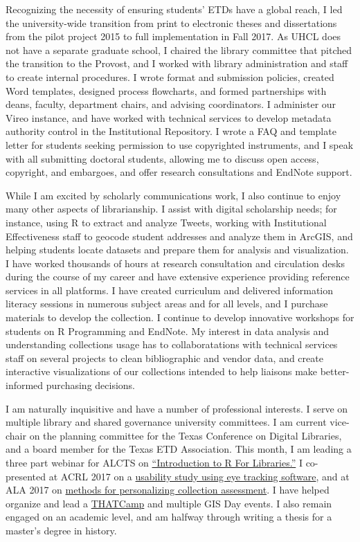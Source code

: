 \documentclass[12pt]{article}
\begin{document}
Recognizing the necessity of ensuring students' ETDs have a global reach, I led the university-wide transition from print to electronic theses and dissertations from the pilot project 2015 to full implementation in Fall 2017. As UHCL does not have a separate graduate school, I chaired the library committee that pitched the transition to the Provost, and I worked with library administration and staff to create internal procedures. I wrote format and submission policies, created Word templates, designed process flowcharts, and formed partnerships with deans, faculty, department chairs, and advising coordinators. I administer our Vireo instance, and have worked with technical services to develop metadata authority control in the Institutional Repository. I wrote a FAQ and template letter for students seeking permission to use copyrighted instruments, and I speak with all submitting doctoral students, allowing me to discuss open access, copyright, and embargoes, and offer research consultations and EndNote support. 

While I am excited by scholarly communications work, I also continue to enjoy many other aspects of librarianship. I assist with digital scholarship needs; for instance, using R to extract and analyze Tweets, working with Institutional Effectiveness staff to geocode student addresses and analyze them in ArcGIS, and helping students locate datasets and prepare them for analysis and visualization. I have worked thousands of hours at research consultation and circulation desks during the course of my career and have extensive experience providing reference services in all platforms. I have created curriculum and delivered information literacy sessions in numerous subject areas and for all levels, and I purchase materials to develop the collection. I continue to develop innovative workshops for students on R Programming and EndNote. My interest in data analysis and understanding collections usage has to collaboratations with technical services staff on several projects to clean bibliographic and vendor data, and create interactive visualizations of our collections intended to help liaisons make better-informed purchasing decisions. 

I am naturally inquisitive and have a number of professional interests. I serve on multiple library and shared governance university committees. I am current vice-chair on the planning committee for the Texas Conference on Digital Libraries, and a board member for the Texas ETD Association. This month, I am leading a three part webinar for ALCTS on \href{http://www.ala.org/alcts/confevents/upcoming/webinar/IntrotoR}{``Introduction to R For Libraries.''} I co-presented at ACRL 2017 on a \href{http://www.ala.org/acrl/sites/ala.org.acrl/files/content/conferences/confsandpreconfs/2017/IDontKnowWhatImLookingat.pdf}{usability study using eye tracking software}, and at ALA 2017 on \href{http://alcts.ala.org/news/2017/ac-personalizing-assessment/}{methods for personalizing collection assessment}. I have helped organize and lead a \href{http://clearlake2017.thatcamp.org/}{THATCamp} and multiple GIS Day events. I also remain engaged on an academic level, and am halfway through writing a thesis for a master's degree in history.
\end{document}

